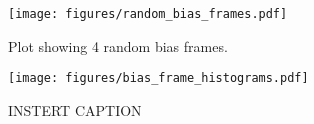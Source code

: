 \documentclass{aastex631}
\begin{document}
\begin{figure}[ht!]
    \begin{centering}
        \texttt{[image: figures/random\_bias\_frames.pdf]}
        \caption{
            Plot showing 4 random bias frames.
        }
        \label{fig:random_bias}
    \end{centering}
\end{figure}

\begin{figure}[ht!]
    \begin{centering}
        \texttt{[image: figures/bias\_frame\_histograms.pdf]}
        \caption{
            INSTERT CAPTION
        }
        \label{fig:bias_frame_histograms}
    \end{centering}
\end{figure}



\end{document}
